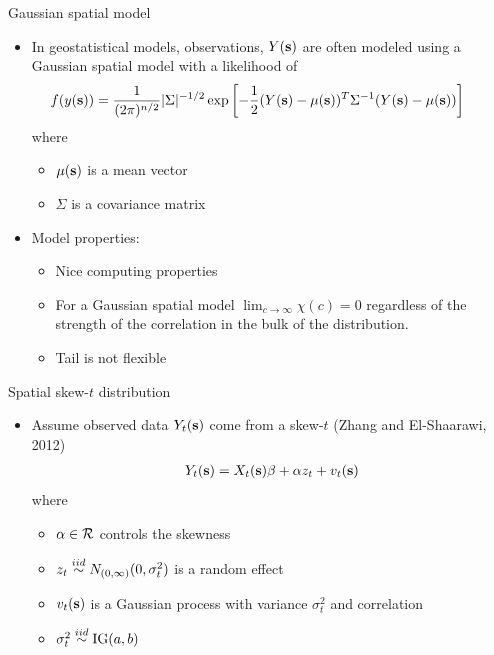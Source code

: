 \documentclass{beamer}
\begin{document}
\begin{frame}{Gaussian spatial model}
  \begin{itemize} \setlength{\itemsep}{0.5em}
    \item In geostatistical models, observations, $Y(\mbox{\bf s})$ are often modeled using a Gaussian spatial model with a likelihood of
      \begin{align*}
    	\hspace{-2em}
    	f(y(\bs)) = \frac{ 1 }{ (2 \pi)^{n/2} } | \Sigma |^{-1/2} \exp \left[ -\frac{ 1 }{ 2 } (Y(\bs) - \mu(\bs) )^T \Sigma^{-1} (Y(\bs) - \mu(\bs)) \right]
    \end{align*}
    where
    \begin{itemize}
    	\item $\mu(\mbox{\bf s})$ is a mean vector
	\item $\Sigma$ is a covariance matrix
    \end{itemize}
    \item Model properties:
    \begin{itemize}
      \item Nice computing properties
    \item For a Gaussian spatial model $\lim_{c \rightarrow \infty} \chi(c) = 0$ regardless of the strength of the correlation in the bulk of the distribution.
    \item Tail is not flexible
    \end{itemize}
    \end{itemize}
\end{frame}

\begin{frame}{Spatial skew-$t$ distribution}
  \begin{itemize} \setlength{\itemsep}{0.5em}
    \item Assume observed data $Y_t(\mbox{\bf s})$ come from a skew-$t$ (Zhang and El-Shaarawi, 2012)
    \begin{align*}
      Y_t(\mbox{\bf s}) = X_t(\mbox{\bf s})\beta + \alpha z_t + v_t(\mbox{\bf s})
    \end{align*}
    where
    \begin{itemize} \setlength{\itemsep}{0.25em}
      \item $\alpha \in {\cal R}$ controls the skewness
      \item $z_t \stackrel{iid}{\sim} N_{(0, \infty)}(0, \sigma^2_t)$ is a random effect
      \item $v_t(\mbox{\bf s})$ is a Gaussian process with variance $\sigma^2_t$ and \Matern correlation
      \item $\sigma_t^2 \stackrel{iid}{\sim} \text{IG}(a, b)$
    \end{itemize}
  \end{itemize}
\end{frame}
\end{document}
